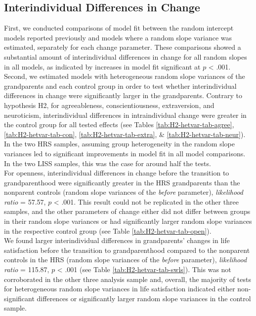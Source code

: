 \documentclass[
  english,
  man, noextraspace,floatsintext]{apa7}
\begin{document}
\hypertarget{interindividual-differences-in-change}{%
\subsection{Interindividual Differences in Change}\label{interindividual-differences-in-change}}

First, we conducted comparisons of model fit between the random intercept models reported previously and models where a random slope variance was estimated, separately for each change parameter. These comparisons showed a substantial amount of interindividual differences in change for all random slopes in all models, as indicated by increases in model fit significant at \(p\) \textless{} .001.\\
Second, we estimated models with heterogeneous random slope variances of the grandparents and each control group in order to test whether interindividual differences in change were significantly larger in the grandparents. Contrary to hypothesis H2, for agreeableness, conscientiousness, extraversion, and neuroticism, interindividual differences in intraindividual change were greater in the control group for all tested effects (see Tables \ref{tab:H2-hetvar-tab-agree}, \ref{tab:H2-hetvar-tab-con}, \ref{tab:H2-hetvar-tab-extra}, \& \ref{tab:H2-hetvar-tab-neur}). In the two HRS samples, assuming group heterogeneity in the random slope variances led to significant improvements in model fit in all model comparisons. In the two LISS samples, this was the case for around half the tests.\\
For openness, interindividual differences in change before the transition to grandparenthood were significantly greater in the HRS grandparents than the nonparent controls (random slope variances of the \emph{before} parameter), \emph{likelihood ratio} = 57.57, \(p\) \textless{} .001. This result could not be replicated in the other three samples, and the other parameters of change either did not differ between groups in their random slope variances or had significantly larger random slope variances in the respective control group (see Table \ref{tab:H2-hetvar-tab-open}).\\
We found larger interindividual differences in grandparents' changes in life satisfaction before the transition to grandparenthood compared to the nonparent controls in the HRS (random slope variances of the \emph{before} parameter), \emph{likelihood ratio} = 115.87, \(p\) \textless{} .001 (see Table \ref{tab:H2-hetvar-tab-swls}). This was not corroborated in the other three analysis sample and, overall, the majority of tests for heterogeneous random slope variances in life satisfaction indicated either non-significant differences or significantly larger random slope variances in the control sample.
\end{document}
